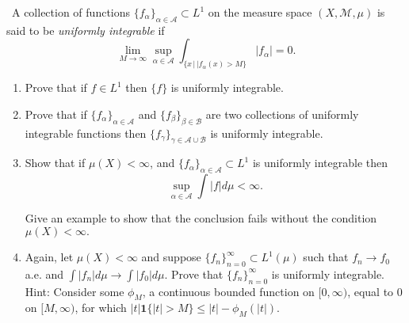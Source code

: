 \documentclass[12pt]{Homework}
\begin{document}
\begin{problem} $\,$
A collection of functions $\{f_\alpha\}_{\alpha\in\mathscr{A}}\subset L^1$ on the measure space $(X,\mathscr{M},\mu)$ is said to be \textit{uniformly integrable} if $$\lim_{M\to\infty}\sup_{\alpha\in\mathscr{A}}\int_{\{x\,|\,|f_\alpha(x)>M\}}|f_\alpha|=0.$$
\begin{enumerate}[label=(\alph*)]
    \item Prove that if $f\in L^1$ then $\{f\}$ is uniformly integrable.
    \item Prove that if $\{f_\alpha\}_{\alpha\in\mathscr{A}}$ and $\{f_\beta\}_{\beta\in\mathscr{B}}$ are two collections of uniformly integrable functions then $\{f_\gamma\}_{\gamma\in\mathscr{A}\cup\mathscr{B}}$ is uniformly integrable.
    \item Show that if $\mu(X)<\infty$, and $\{f_\alpha\}_{\alpha\in\mathscr{A}}\subset L^1$ is uniformly integrable then $$\sup_{\alpha\in\mathscr{A}}\int|f|d\mu<\infty.$$
    
    Give an example to show that the conclusion fails without the condition $\mu(X)<\infty.$
    \item Again, let $\mu(X)<\infty$ and suppose $\{f_n\}_{n=0}^\infty\subset L^1(\mu)$ such that $f_n\to f_0$ a.e. and $\int|f_n|d\mu\to\int|f_0|d\mu$. Prove that $\{f_n\}_{n=0}^\infty$ is uniformly integrable. Hint: Consider some $\phi_M$, a continuous bounded function on $[0,\infty)$, equal to $0$ on $[M,\infty)$, for which $|t|\mathbf{1}\{|t|>M\}\le|t|-\phi_M(|t|).$
\end{enumerate}
\end{problem}
\end{document}
